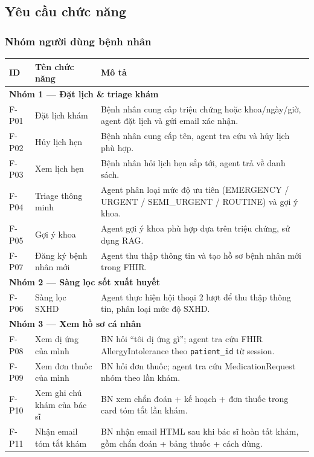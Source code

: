 \documentclass[a4paper,13pt,3p,twoside,openany]{report}
\theoremstyle{definition}
\theoremstyle{remark}
\theoremstyle{definition}
\let\ORIGsubsection\subsection
\renewcommand{\subsection}{\needspace{3\baselineskip}\ORIGsubsection}
\begin{document}
\subsection{Yêu cầu chức năng}

\subsubsection{Nhóm người dùng bệnh nhân}

\begin{table}[H]
\centering
\begin{tabular}{|l|p{4cm}|p{8cm}|}
\hline
\textbf{ID} & \textbf{Tên chức năng} & \textbf{Mô tả} \\
\hline
\multicolumn{3}{|l|}{\textbf{Nhóm 1 --- Đặt lịch \& triage khám}} \\
\hline
F-P01 & Đặt lịch khám & Bệnh nhân cung cấp triệu chứng hoặc khoa/ngày/giờ, agent đặt lịch và gửi email xác nhận. \\
\hline
F-P02 & Hủy lịch hẹn & Bệnh nhân cung cấp tên, agent tra cứu và hủy lịch phù hợp. \\
\hline
F-P03 & Xem lịch hẹn & Bệnh nhân hỏi lịch hẹn sắp tới, agent trả về danh sách. \\
\hline
F-P04 & Triage thông minh & Agent phân loại mức độ ưu tiên (EMERGENCY / URGENT / SEMI\_URGENT / ROUTINE) và gợi ý khoa. \\
\hline
F-P05 & Gợi ý khoa & Agent gợi ý khoa phù hợp dựa trên triệu chứng, sử dụng RAG. \\
\hline
F-P07 & Đăng ký bệnh nhân mới & Agent thu thập thông tin và tạo hồ sơ bệnh nhân mới trong FHIR. \\
\hline
\multicolumn{3}{|l|}{\textbf{Nhóm 2 --- Sàng lọc sốt xuất huyết}} \\
\hline
F-P06 & Sàng lọc SXHD & Agent thực hiện hội thoại 2 lượt để thu thập thông tin, phân loại mức độ SXHD. \\
\hline
\multicolumn{3}{|l|}{\textbf{Nhóm 3 --- Xem hồ sơ cá nhân}} \\
\hline
F-P08 & Xem dị ứng của mình & BN hỏi ``tôi dị ứng gì''; agent tra cứu FHIR AllergyIntolerance theo \texttt{patient\_id} từ session. \\
\hline
F-P09 & Xem đơn thuốc của mình & BN hỏi đơn thuốc; agent tra cứu MedicationRequest nhóm theo lần khám. \\
\hline
F-P10 & Xem ghi chú khám của bác sĩ & BN xem chẩn đoán + kế hoạch + đơn thuốc trong card tóm tắt lần khám. \\
\hline
F-P11 & Nhận email tóm tắt khám & BN nhận email HTML sau khi bác sĩ hoàn tất khám, gồm chẩn đoán + bảng thuốc + cách dùng. \\

\end{tabular}
\end{table}
\end{document}
